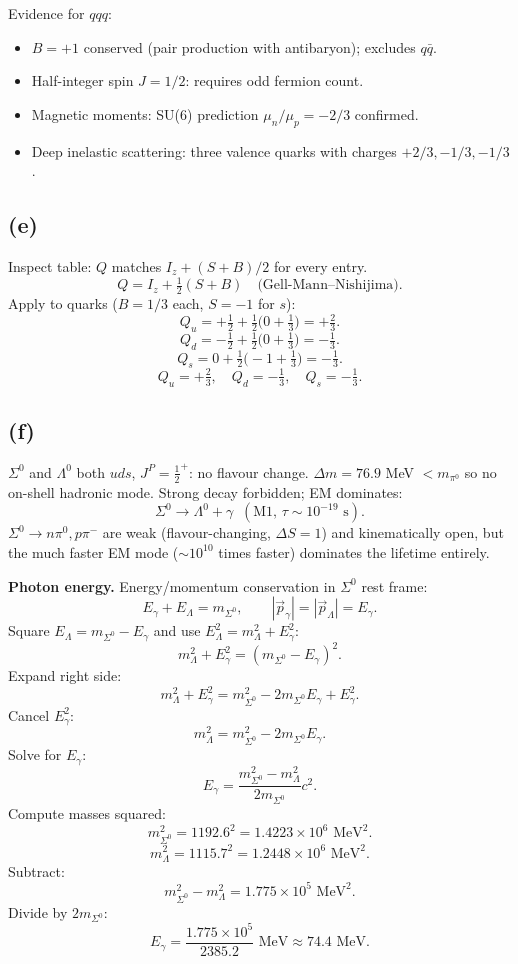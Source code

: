 \documentclass[11pt]{article}
\begin{document}
Evidence for $qqq$:
\begin{itemize}
\item $B=+1$ conserved (pair production with antibaryon); excludes $q\bar q$.
\item Half-integer spin $J=1/2$: requires odd fermion count.
\item Magnetic moments: SU(6) prediction $\mu_n/\mu_p = -2/3$ confirmed.
\item Deep inelastic scattering: three valence quarks with charges $+2/3,-1/3,-1/3$.
\end{itemize}

\subsection*{(e)}

Inspect table: $Q$ matches $I_z + (S+B)/2$ for every entry.
\[ \boxed{\;Q = I_z + \tfrac12 (S+B)\quad\text{(Gell-Mann--Nishijima)}.\;} \]
Apply to quarks ($B=1/3$ each, $S=-1$ for $s$):
\[ Q_u = +\tfrac12 + \tfrac12\bigl(0 + \tfrac13\bigr) = +\tfrac{2}{3}. \]
\[ Q_d = -\tfrac12 + \tfrac12\bigl(0 + \tfrac13\bigr) = -\tfrac{1}{3}. \]
\[ Q_s = 0 + \tfrac12\bigl(-1 + \tfrac13\bigr) = -\tfrac{1}{3}. \]
\[ \boxed{\;Q_u = +\tfrac{2}{3},\quad Q_d = -\tfrac{1}{3},\quad Q_s = -\tfrac{1}{3}.\;} \]

\subsection*{(f)}

$\Sigma^0$ and $\Lambda^0$ both $uds$, $J^P=\tfrac12^+$: no flavour change. $\Delta m = 76.9$ MeV $< m_{\pi^0}$ so no on-shell hadronic mode. Strong decay forbidden; EM dominates:
\[ \boxed{\;\Sigma^0 \to \Lambda^0 + \gamma\;\;(\text{M1, }\tau\sim 10^{-19}\text{ s}).\;} \]
$\Sigma^0\to n\pi^0, p\pi^-$ are weak (flavour-changing, $\Delta S=1$) and kinematically open, but the much faster EM mode ($\sim 10^{10}$ times faster) dominates the lifetime entirely.

\textbf{Photon energy.} Energy/momentum conservation in $\Sigma^0$ rest frame:
\[ E_\gamma + E_\Lambda = m_{\Sigma^0},\qquad |\vec p_\gamma| = |\vec p_\Lambda| = E_\gamma. \]
Square $E_\Lambda = m_{\Sigma^0} - E_\gamma$ and use $E_\Lambda^2 = m_\Lambda^2 + E_\gamma^2$:
\[ m_\Lambda^2 + E_\gamma^2 = (m_{\Sigma^0} - E_\gamma)^2. \]
Expand right side:
\[ m_\Lambda^2 + E_\gamma^2 = m_{\Sigma^0}^2 - 2 m_{\Sigma^0} E_\gamma + E_\gamma^2. \]
Cancel $E_\gamma^2$:
\[ m_\Lambda^2 = m_{\Sigma^0}^2 - 2 m_{\Sigma^0} E_\gamma. \]
Solve for $E_\gamma$:
\[ \boxed{\;E_\gamma = \frac{m_{\Sigma^0}^2 - m_\Lambda^2}{2 m_{\Sigma^0}}c^2.\;} \]
Compute masses squared:
\[ m_{\Sigma^0}^2 = 1192.6^2 = 1.4223\times 10^6\text{ MeV}^2. \]
\[ m_\Lambda^2 = 1115.7^2 = 1.2448\times 10^6\text{ MeV}^2. \]
Subtract:
\[ m_{\Sigma^0}^2 - m_\Lambda^2 = 1.775\times 10^5\text{ MeV}^2. \]
Divide by $2 m_{\Sigma^0}$:
\[ E_\gamma = \frac{1.775\times 10^5}{2385.2}\text{ MeV} \approx 74.4\text{ MeV}. \]
\end{document}
